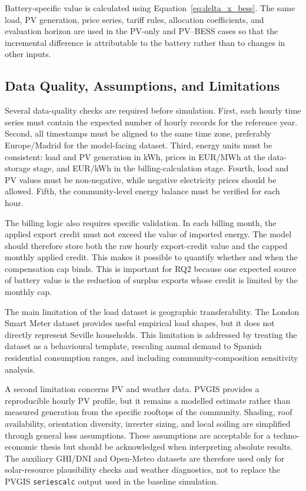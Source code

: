 Battery-specific value is calculated using Equation~\eqref{eq:delta_x_bess}. The same load, PV generation, price series, tariff rules, allocation coefficients, and evaluation horizon are used in the PV-only and PV--BESS cases so that the incremental difference is attributable to the battery rather than to changes in other inputs.

\subsection{Data Quality, Assumptions, and Limitations}
\label{sec:data_quality_assumptions_limitations}

Several data-quality checks are required before simulation. First, each hourly time series must contain the expected number of hourly records for the reference year. Second, all timestamps must be aligned to the same time zone, preferably Europe/Madrid for the model-facing dataset. Third, energy units must be consistent: load and PV generation in kWh, prices in EUR/MWh at the data-storage stage, and EUR/kWh in the billing-calculation stage. Fourth, load and PV values must be non-negative, while negative electricity prices should be allowed. Fifth, the community-level energy balance must be verified for each hour.

The billing logic also requires specific validation. In each billing month, the applied export credit must not exceed the value of imported energy. The model should therefore store both the raw hourly export-credit value and the capped monthly applied credit. This makes it possible to quantify whether and when the compensation cap binds. This is important for RQ2 because one expected source of battery value is the reduction of surplus exports whose credit is limited by the monthly cap.

The main limitation of the load dataset is geographic transferability. The London Smart Meter dataset provides useful empirical load shapes, but it does not directly represent Seville households. This limitation is addressed by treating the dataset as a behavioural template, rescaling annual demand to Spanish residential consumption ranges, and including community-composition sensitivity analysis.

A second limitation concerns PV and weather data. PVGIS provides a reproducible hourly PV profile, but it remains a modelled estimate rather than measured generation from the specific rooftops of the community. Shading, roof availability, orientation diversity, inverter sizing, and local soiling are simplified through general loss assumptions. These assumptions are acceptable for a techno-economic thesis but should be acknowledged when interpreting absolute results. The auxiliary GHI/DNI and Open-Meteo datasets are therefore used only for solar-resource plausibility checks and weather diagnostics, not to replace the PVGIS \texttt{seriescalc} output used in the baseline simulation.

